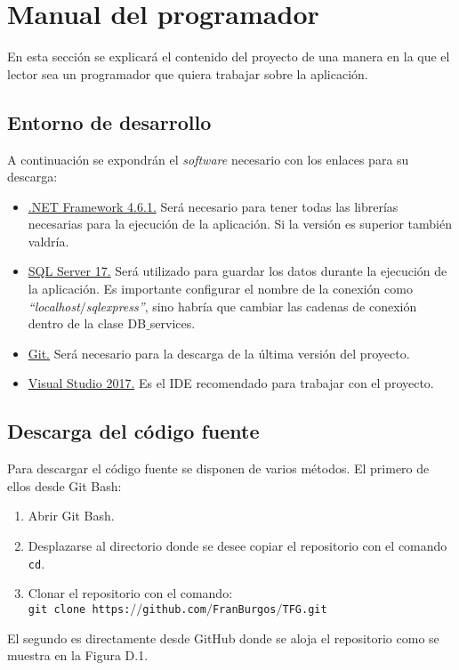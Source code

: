 \section{Manual del programador}

En esta sección se explicará el contenido del proyecto de una manera en la que el lector sea un programador que quiera trabajar sobre la aplicación.

\subsection{Entorno de desarrollo}

A continuación se expondrán el \textit{software} necesario con los enlaces para su descarga:
\begin{itemize}
	\item \href{https://www.microsoft.com/es-es/download/details.aspx?id=49982}{.NET Framework 4.6.1.} Será necesario para tener todas las librerías necesarias para la ejecución de la aplicación. Si la versión es superior también valdría.
	\item \href{https://www.microsoft.com/es-es/sql-server/sql-server-downloads}{SQL Server 17.} Será utilizado para guardar los datos durante la ejecución de la aplicación. Es importante configurar el nombre de la conexión como \textit{``localhost$\slash$sqlexpress''}, sino habría que cambiar las cadenas de conexión dentro de la clase DB$\_$services.
	\item \href{https://git-scm.com/downloads}{Git.} Será necesario para la descarga de la última versión del proyecto.
	\item \href{https://visualstudio.microsoft.com/es/downloads/}{Visual Studio 2017.} Es el IDE recomendado para trabajar con el proyecto.
\end{itemize}

\subsection{Descarga del código fuente}

Para descargar el código fuente se disponen de varios métodos. El primero de ellos desde Git Bash:
\begin{enumerate}
	\item Abrir Git Bash.
	\item Desplazarse al directorio donde se desee copiar el repositorio con el comando \texttt{cd}.
	\item Clonar el repositorio con el comando:\\ \texttt{git clone https:$\slash\slash$github.com$\slash$FranBurgos$\slash$TFG.git}
\end{enumerate}
El segundo es directamente desde GitHub donde se aloja el repositorio como se muestra en la Figura D.1.

